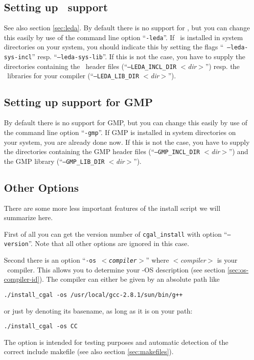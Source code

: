 \subsection{Setting up \leda\ support}\label{sec:leda-setup}

See also section \ref{sec:leda}. By default there is no support for
\leda, but you can change this easily by use of the command line
option ``\texttt{-leda}''. If \leda\ is installed in system directories
on your system, you should indicate this by setting the flags ``{\tt
  --leda-sys-incl}'' resp.  ``\texttt{--leda-sys-lib}''. If this is not
the case, you have to supply the directories containing the \leda\ 
header files (``\texttt{--LEDA\_INCL\_DIR} \textit{$<$dir$>$}'') resp. the
\leda\ libraries for your compiler (``\texttt{--LEDA\_LIB\_DIR} {\it
  $<$dir$>$}'').

\subsection{Setting up support for GMP}\label{sec:gmp-setup}

By default there is no support for GMP, but you can change this easily
by use of the command line option ``\texttt{-gmp}''. If GMP is installed
in system directories on your system, you are already done now. If
this is not the case, you have to supply the directories containing
the GMP header files (``\texttt{--GMP\_INCL\_DIR} \textit{$<$dir$>$}'') and
the GMP library (``\texttt{--GMP\_LIB\_DIR} \textit{$<$dir$>$}'').

\subsection{Other Options}\label{sec:other-options}

There are some more less important features of the install script
we will summarize here. 

First of all you can get the version number of \texttt{cgal\_install}
with option ``\texttt{--version}''. Note that all other options are
ignored in this case.

Second there is an option ``\texttt{-os \textit{$<$compiler$>$}}''
where \textit{$<$compiler$>$} is your \CC\ compiler. This allows you
to determine your \cgal-OS description (see section
\ref{sec:os-compiler-id}). The compiler can either be given by an
absolute path like
\begin{verbatim}
./install_cgal -os /usr/local/gcc-2.8.1/sun/bin/g++
\end{verbatim}
or just by denoting its basename, as long as it is on your path:
\begin{verbatim}
./install_cgal -os CC
\end{verbatim}
The option is intended for testing purposes and automatic detection of
the correct include makefile (see also section \ref{sec:makefiles}).

